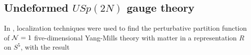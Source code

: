 \documentclass[12pt]{article}
\begin{document}
\subsection{Undeformed $USp(2N)$ gauge theory}
In , localization techniques were used to find the perturbative partition function of ${\cal N} = 1$ five-dimensional Yang-Mills theory with matter in a representation $R$ on $S^5$, with the result
\end{document}
